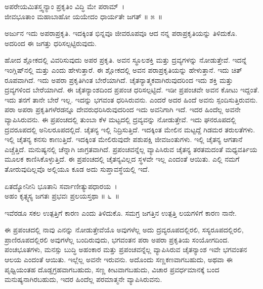 \begin{shloka}
ಅಪರೇಯಮಿತಸ್ತ್ವನ್ಯಾಂ ಪ್ರಕೃತಿಂ ವಿದ್ಧಿ ಮೇ ಪರಾಮ್~।\\ಜೀವಭೂತಾಂ ಮಹಾಬಾಹೋ ಯಯೇದಂ ಧಾರ್ಯತೇ ಜಗತ್ \hfill॥ ೫~॥
\end{shloka}

\begin{artha}
ಅರ್ಜುನ ಇದು ಅಪರಾಪ್ರಕೃತಿ. ಇದಕ್ಕಿಂತ ಭಿನ್ನವೂ ಜೀವರೂಪವೂ ಆದ ನನ್ನ ಪರಾಪ್ರಕೃತಿಯನ್ನು ತಿಳಿದುಕೊ. ಅದರಿಂದ ಈ ಜಗತ್ತು ಧರಿಸಲ್ಪಟ್ಟಿರುವುದು.
\end{artha}

ಹೋದ ಶ್ಲೋಕದಲ್ಲಿ ವಿವರಿಸುವುದು ಅಪರ ಪ್ರಕೃತಿ. ಅವನ ಸ್ಥೂಲಶಕ್ತಿ ಮತ್ತು ದ್ರವ್ಯಗಳನ್ನು ನೋಡುತ್ತೇವೆ. ಇದನ್ನೆ ಇಂಗ್ಲಿಷ್​ನಲ್ಲಿ  ಮತ್ತು  ಎಂದು ಹೇಳುತ್ತಾರೆ. ಈ ಶ್ಲೋಕದಲ್ಲಿ ಅವನ ಪರಾಪ್ರಕೃತಿಯನ್ನು ಹೇಳುತ್ತಾನೆ. ಇದು ಚಿತ್​ರೂಪವಾಗಿದೆ. ಇದು ಅಪರಾ ಪ್ರಕೃತಿಗಿಂತ ಬೇರೆಯಾಗಿದೆ. ಚೈತನ್ಯಾತ್ಮಕವಾಗಿರುವುದರಿಂದ ಇದು ಶಕ್ತಿ ಮತ್ತು ದ್ರವ್ಯಗಳಿಂದ ಬೇರೆಯಾಗಿದೆ. ಈ ಚೈತನ್ಯಾಂಶದಿಂದ ಪ್ರಪಂಚ ಧರಿಸಲ್ಪಟ್ಟಿದೆ. ಇಡೀ ಪ್ರಪಂಚವೇ ಅವನ ಕೋಟು ಇದ್ದಂತೆ. ಇದು ತನಗೆ ತಾನೇ ಬೇರೆ ಇಲ್ಲ. ಇದನ್ನು ಭಗವಂತ ಧರಿಸಿರುವನು. ಎಂದರೆ ಅದರ ಹಿಂದೆ ಅವನು ಸ್ಪಂದಿಸುತ್ತಿರುವನು. ಪರಾ ಅಪರಾ ಪ್ರಕೃತಿಗಳೆರಡನ್ನೂ ದೇವರು\break ಧರಿಸಿರುವುದರಿಂದ ಇದು ಅವನಿಗಾಗಿ ಇದೆ. ಇದರ ಹಿಂದೆಲ್ಲ ಅವನೇ ವ್ಯಾಪಿಸಿರುವನು. ಈ ಪ್ರಪಂಚದಲ್ಲಿ ತುಂಬಾ ಕೆಳ ಮಟ್ಟದಲ್ಲಿ ದ್ರವ್ಯವನ್ನು ನೋಡುತ್ತೇವೆ. ಇದು ಘನರೂಪದಲ್ಲಿ ದ್ರವರೂಪದಲ್ಲಿ ಅನಿಲರೂಪದಲ್ಲಿದೆ. ಚೈತನ್ಯ ಇಲ್ಲಿ ನಿದ್ರಿಸುತ್ತಿದೆ. ಇದಕ್ಕಿಂತ ಮೇಲಿನ ಮಟ್ಟದ್ದೆ ಗಿಡಮರ ತರುಲತೆಗಳು. ಇಲ್ಲಿ ಚೈತನ್ಯ ಕನಸು ಕಾಣುತ್ತಿದೆ. ಇದಕ್ಕಿಂತ ಮೇಲಿರುವುದೇ ಪಶುಪಕ್ಷಿ ಜೀವಜಂತುಗಳು. ಇಲ್ಲಿ ಚೈತನ್ಯ ಆಗತಾನೆ ಎಚ್ಚೆತ್ತಿದೆ. ಮನುಷ್ಯನಲ್ಲಿ ಚೆನ್ನಾಗಿ ಜಾಗ್ರತವಾಗಿದೆ. ಪ್ರಪಂಚವನ್ನೆಲ್ಲ ವ್ಯಾಪಿಸಿರುವ ಚೈತನ್ಯ ತರತಮದಂತೆ ಮಧ್ಯವರ್ತಿಯ ಮೂಲಕ ಕಾಣಿಸಿಕೊಳ್ಳುತ್ತಿದೆ. ಈ ಪ್ರಪಂಚದಲ್ಲಿ ಚೈತನ್ಯವಿಲ್ಲದ ಸ್ಥಳವೇ ಇಲ್ಲ ಎಂದಂತೆ ಆಯಿತು. ಎಲ್ಲಿ ನಮಗೆ ತೋರುವುದಿಲ್ಲವೊ ಅಲ್ಲಿಯೂ ಕೂಡ ಅದು ಸುಪ್ತಾವಸ್ಥೆಯಲ್ಲಿ ಇದೆ.

\begin{shloka}
ಏತದ್ಯೋನೀನಿ ಭೂತಾನಿ ಸರ್ವಾಣೀತ್ಯುಪಧಾರಯ~।\\ಅಹಂ ಕೃತ್ಸ್ನಸ್ಯ ಜಗತಃ ಪ್ರಭವಃ ಪ್ರಲಯಸ್ತಥಾ \hfill॥ ೬~॥
\end{shloka}

\begin{artha}
ಇವೆರಡೂ ಸಕಲ ಉತ್ಪತ್ತಿಗೆ ಕಾರಣ ಎಂದು ತಿಳಿದುಕೊ. ಸಮಗ್ರ ಜಗತ್ತಿನ ಉತ್ಪತ್ತಿ ಲಯಗಳಿಗೆ ಕಾರಣ ನಾನೇ.
\end{artha}

ಈ ಪ್ರಪಂಚದಲ್ಲಿ ನಾವು ಎನನ್ನು ನೋಡುತ್ತೇವೆಯೊ ಅವುಗಳೆಲ್ಲ ಅದು ದ್ರವ್ಯರೂಪದಲ್ಲಿರಲಿ, ಸಸ್ಯರೂಪದಲ್ಲಿರಲಿ, ಪ್ರಾಣಿರೂಪದಲ್ಲಿರಲಿ ಅವುಗಳೆಲ್ಲ ಬಂದಿರುವುದು, ಭಗವಂತನ ಪರಾ ಅಪರಾ ಪ್ರಕೃತಿಯ ಸಂಯೋಗದಿಂದ. ಪಂಚಭೂತಗಳು, ಮನಸ್ಸು ಬುದ್ಧಿ ಅಹಂಕಾರ ಮತ್ತು ಪ್ರಪಂಚ\-ವನ್ನೆಲ್ಲ ವ್ಯಾಪಿಸಿರುವ ಚೈತನ್ಯಾಂಶ ಇವೇ ಭಗವಂತನ ಆಲಯ ಎಂದಂತೆ ಆಯಿತು. ಇಲ್ಲೆಲ್ಲ ಅವನೇ ಇರುವನು. ಅದೊಂದು ಸಣ್ಣಕಣವಾಗಬಹುದು, ಅಥವಾ ಈ ಪೃಥ್ವಿಯಂತಹ ದೊಡ್ಡ\break ಗ್ರಹವಾಗಬಹುದು, ಸಣ್ಣ ಕೀಟವಾಗಬಹುದು, ವಿಚಾರ ಪ್ರವರ್ಧಮಾನಕ್ಕೆ ಬಂದ ಮನುಷ್ಯನಾಗಿರಬಹುದು, ಇದರ ಹಿಂದೆಲ್ಲ ಪರಮಾತ್ಮನೇ ವ್ಯಾಪಿಸಿರುವನು.

